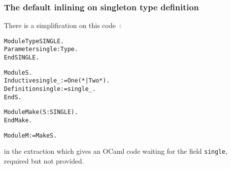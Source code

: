\documentclass[a4paper, 11pt]{article}
\newenvironment{coq}
  {%
   \begin{alltt}
   \footnotesize} %% 8.3pl2 (April 2011)
  {\end{alltt} %
  }
\begin{document}
\subsubsection{The default inlining on singleton type definition}
\label{s:appendix_singl}
There is a simplification on this code~:
\begin{coq}
Module Type SINGLE.
  Parameter single : Type.
End SINGLE.

Module S.
  Inductive single_ := One (*| Two*).
  Definition single := single_.
End S.

Module Make (S : SINGLE).
End Make.

Module M := Make S.
\end{coq}
in the extraction which gives an OCaml code waiting for the field \verb|single|, required but not provided.
\end{document}
